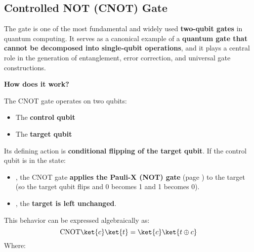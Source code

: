 \subsection{Controlled NOT (CNOT) Gate}

The  gate is one of the most fundamental and widely used \textbf{two-qubit gates} in quantum computing. It serves as a canonical example of a \textbf{quantum gate that cannot be decomposed into single-qubit operations}, and it plays a central role in the generation of entanglement, error correction, and universal gate constructions.

\highspace
\begin{flushleft}
    \textcolor{Green3}{ \textbf{How does it work?}}
\end{flushleft}
The CNOT gate operates on two qubits:
\begin{itemize}
    \item The \textbf{control qubit} 
    \item The \textbf{target qubit} 
\end{itemize}
Its defining action is \textbf{conditional flipping of the target qubit}. If the control qubit is in the state:
\begin{itemize}
    \item {}, the CNOT gate \textbf{applies the Pauli-X (NOT) gate} (page \pageref{subsubsection: Pauli-X NOT Gate}) to the target (so the target qubit flips and 0 becomes 1 and 1 becomes 0).
    \item {}, the \textbf{target is left unchanged}.
\end{itemize}
This behavior can be expressed algebraically as:
\begin{equation}
    \text{CNOT} \ket{c}\ket{t} = \ket{c} \ket{t \oplus c}    
\end{equation}
Where:
